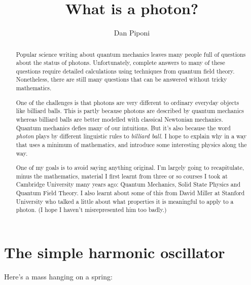 \documentclass[a4paper]{article}
\title{What is a photon?}
\author{Dan Piponi}
\begin{document}
\maketitle

\begin{abstract}
Popular science writing about quantum mechanics leaves many people full of questions about the status of photons.
Unfortunately, complete answers to many of these questions require detailed calculations using techniques from quantum field theory.
Nonetheless, there are still many questions that can be answered without tricky mathematics.

One of the challenges is that photons are very different to ordinary everyday objects like billiard balls.
This is partly because photons are described by quantum mechanics whereas billiard balls are better modelled with classical Newtonian mechanics.
Quantum mechanics defies many of our intuitions.
But it's also because the word {\em photon} plays by different linguistic rules to {\em billiard ball}.
I hope to explain why in a way that uses a minimum of mathematics, and introduce some interesting physics along the way.

One of my goals is to avoid saying anything original. I'm largely going to recapitulate, minus the mathematics, material I first learnt from three or so courses I took at Cambridge University many years ago: Quantum Mechanics, Solid State Physics and Quantum Field Theory.
I also learnt about some of this from David Miller at Stanford University who talked a little about what properties it is meaningful to apply to a photon.
(I hope I haven't misrepresented him too badly.)
\end{abstract}

\section{The simple harmonic oscillator}

Here's a mass hanging on a spring:

\begin{center}
\end{center}
\end{document}
